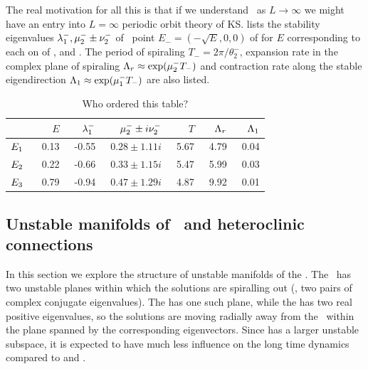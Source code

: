 The real motivation for all this is that if we understand \eqva\ as
$L \to \infty$ we might have an entry into $L = \infty$ periodic orbit
theory of KS.
 lists the stability eigenvalues
$\eigExp[1]^-,\eigRe[2]^-\pm\eigIm[2]^-$
of \eqv\ point $E_{-}=(-\sqrt{E},0,0)$
of  for $E$ corresponding to each on of , 
 and  \eqva.
The period of spiraling $T_{-}=2\pi/\theta^-_2$, expansion
rate in the complex plane of spiraling
$\ExpaEig_r\approx\exp(\eigRe[2]^- T_-)$ and contraction
rate along the stable eigendirection
$\ExpaEig_1\approx\exp(\eigRe[1]^- T_-)$ are also listed.

\begin{table}[h!]
    \caption{Who ordered this table? }
\begin{center} \footnotesize
    \begin{tabular}{l|rrrrrr}
                & $E$   &$\eigExp[1]^-$ & $\eigRe[2]^-\pm i \eigIm[2]^-$   & $T$ & $\ExpaEig_r$  & $\ExpaEig_1$  \\ \hline
        $\EQV{1}\ $ &\ 0.13 &\ -0.55    &\ $0.28\pm1.11i$       &\ 5.67     &\ 4.79     &\ 0.04 \\ \hline
        $\EQV{2}\ $     &\ 0.22 &\ -0.66    &\ $0.33\pm1.15i$       &\ 5.47     &\ 5.99     &\ 0.03 \\ \hline
        $\EQV{3}\ $     &\ 0.79 &\ -0.94    &\ $0.47\pm1.29i$       &\ 4.87     &\ 9.92     &\ 0.01
    \end{tabular}
\end{center}
\label{tab:L22cminus}
\end{table}


\subsection{Unstable manifolds of \eqva\ and heteroclinic
connections}

In this section we explore the structure of unstable
manifolds of the {\eqva}.  The  \eqv\ has two unstable
planes within which the solutions are spiralling out (\ie, two
pairs of complex conjugate eigenvalues).  The  has one such plane,
while the  has two real positive eigenvalues, so the solutions are
moving radially away from the \eqv\ within the plane spanned
by the corresponding eigenvectors.  Since  has 
a larger unstable
subspace, it is expected to have much less influence on the
long time dynamics compared to  and .


